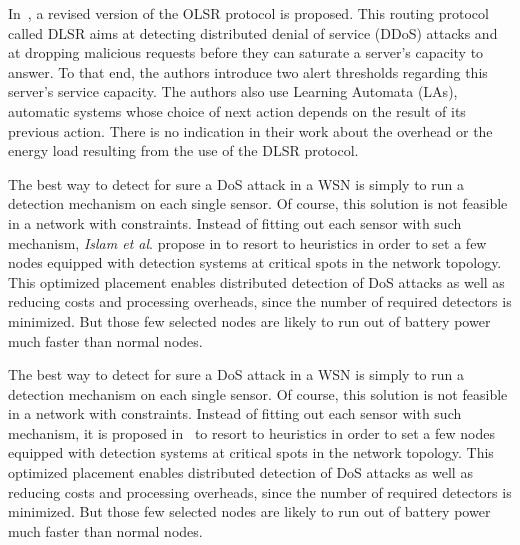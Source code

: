 In~\cite{MKASF10}, a revised version of the OLSR protocol is proposed.
This routing protocol called DLSR aims at detecting distributed denial of service (DDoS) attacks and at dropping malicious requests before they can saturate a server's capacity to answer.
To that end, the authors introduce two alert thresholds regarding this server's service capacity.
The authors also use Learning Automata (LAs), automatic systems whose choice of next action depends on the result of its previous action.
There is no indication in their work about the overhead or the energy load resulting from the use of the DLSR protocol.



The best way to detect for sure a DoS attack in a WSN is simply to run a detection mechanism on each single sensor.
Of course, this solution is not feasible in a network with constraints.
Instead of fitting out each sensor with such mechanism, \textit{Islam et al}. propose in
\cite{INK09}
to resort to heuristics in order to set a few nodes equipped with detection systems at critical spots in the network topology.
This optimized placement enables distributed detection of DoS attacks as well as reducing costs and processing overheads, since the number of required detectors is minimized.
But those few selected nodes are likely to run out of battery power much faster than normal nodes.


The best way to detect for sure a DoS attack in a WSN is simply to run a detection mechanism on each single sensor.
Of course, this solution is not feasible in a network with constraints.
Instead of fitting out each sensor with such mechanism, it is proposed in~\cite{INK09} to resort to heuristics in order to set a few nodes equipped with detection systems at critical spots in the network topology.
This optimized placement enables distributed detection of DoS attacks as well as reducing costs and processing overheads, since the number of required detectors is minimized.
But those few selected nodes are likely to run out of battery power much faster than normal nodes.


